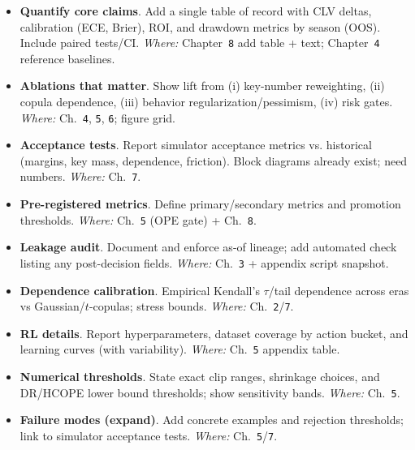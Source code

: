 \begin{itemize}
  \item {} \textbf{Quantify core claims}. Add a single table of record with CLV deltas, calibration (ECE, Brier), ROI, and drawdown metrics by season (OOS). Include paired tests/CI. \emph{Where:} Chapter~\texttt{8} add table + text; Chapter~\texttt{4} reference baselines.
  \item {} \textbf{Ablations that matter}. Show lift from (i) key-number reweighting, (ii) copula dependence, (iii) behavior regularization/pessimism, (iv) risk gates. \emph{Where:} Ch.~\texttt{4}, \texttt{5}, \texttt{6}; figure grid.
  \item {} \textbf{Acceptance tests}. Report simulator acceptance metrics vs. historical (margins, key mass, dependence, friction). Block diagrams already exist; need numbers. \emph{Where:} Ch.~\texttt{7}.
\end{itemize}

\begin{itemize}
  \item {} \textbf{Pre-registered metrics}. Define primary/secondary metrics and promotion thresholds. \emph{Where:} Ch.~\texttt{5} (OPE gate) + Ch.~\texttt{8}.
  \item {} \textbf{Leakage audit}. Document and enforce as-of lineage; add automated check listing any post-decision fields. \emph{Where:} Ch.~\texttt{3} + appendix script snapshot.
\end{itemize}

\begin{itemize}
  \item {} \textbf{Dependence calibration}. Empirical Kendall’s $\tau$/tail dependence across eras vs Gaussian/$t$-copulas; stress bounds. \emph{Where:} Ch.~\texttt{2}/\texttt{7}.
  \item {} \textbf{RL details}. Report hyperparameters, dataset coverage by action bucket, and learning curves (with variability). \emph{Where:} Ch.~\texttt{5} appendix table.
\end{itemize}

\begin{itemize}
  \item {} \textbf{Numerical thresholds}. State exact clip ranges, shrinkage choices, and DR/HCOPE lower bound thresholds; show sensitivity bands. \emph{Where:} Ch.~\texttt{5}.
  \item {} \textbf{Failure modes (expand)}. Add concrete examples and rejection thresholds; link to simulator acceptance tests. \emph{Where:} Ch.~\texttt{5}/\texttt{7}.
\end{itemize}

